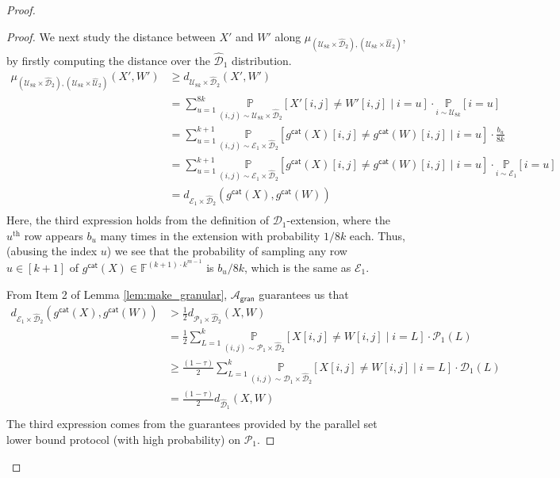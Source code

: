 \documentclass[10pt,a4paper]{article}
\newcommand{\gran}{\mathsf{gran}}
\newcommand{\F}{\mathbb{F}}
\newcommand{\sU}{\mathcal{U}}
\newcommand{\sD}{\mathcal{D}}
\newcommand{\sA}{\mathcal{A}}
\newcommand{\sP}{\mathcal{P}}
\begin{document}
\begin{proof}
\begin{proof}
    We next study the distance between $X'$ and $W'$ along $\mu_{(\sU_{8k} \times \widehat{\sD}_{2}), (\sU_{8k} \times \widehat{\sU}_{2})}$, by firstly computing the distance over the $\widehat{\sD}_{1}$ distribution. 
    \begin{equation*}
        \begin{split}
            \mu_{(\sU_{8k} \times \widehat{\sD}_{2}), (\sU_{8k} \times \widehat{\sU}_{2})} (X', W') &\geq d_{\sU_{8k} \times \widehat{\sD}_{2}} (X', W') \\
            &= \sum_{u=1}^{8k} \underset{(i,j) \sim \sU_{8k} \times \widehat{\sD}_{2}}{\mathbb{P}} \left[ X'[i,j] \neq W'[i,j] \mid i = u \right] \cdot \underset{i \sim \sU_{8k}}{\mathbb{P}} [i=u]\\
             &= \sum_{u=1}^{k+1} \underset{(i,j) \sim \mathcal{E}_{1} \times \widehat{\sD}_{2}}{\mathbb{P}} \left[ g^{\mathsf{cat}}(X)[i,j] \neq g^{\mathsf{cat}}(W)[i,j] \mid i=u \right] \cdot \frac{b_u}{8k} \\
            &= \sum_{u=1}^{k+1} \underset{(i,j) \sim \mathcal{E}_{1} \times \widehat{\sD}_{2}}{\mathbb{P}} \left[ g^{\mathsf{cat}}(X)[i,j] \neq g^{\mathsf{cat}}(W)[i,j] \mid i=u \right] \cdot \underset{i \sim \mathcal{E}_{1}}{\mathbb{P}} [i=u]\\
            &= d_{\mathcal{E}_{1} \times \widehat{\sD}_{2}} (g^{\mathsf{cat}}(X),g^{\mathsf{cat}}(W))\\
        \end{split}
    \end{equation*}
    Here, the third expression holds from the definition of $\sD_{1}$-extension, where the $u^{\text{th}}$ row appears $b_u$ many times in the extension with probability $1/8k$ each. Thus, (abusing the index $u$) we see that the probability of sampling any row $u \in [k+1]$ of $g^{\mathsf{cat}}(X) \in \F^{(k+1)\cdot k^{m-1}}$ is $b_u/8k$, which is the same as $\mathcal{E}_{1}$.

    From Item 2 of Lemma \ref{lem:make_granular}, $\sA_\gran$ guarantees us that
    \begin{equation*}
        \begin{split}
            d_{\mathcal{E}_{1} \times \widehat{\sD}_{2}} (g^{\mathsf{cat}}(X),g^{\mathsf{cat}}(W)) 
            &> \frac{1}{2} d_{\sP_{1} \times \widehat{\sD}_{2}} (X, W) \\
            &= \frac{1}{2}\sum_{L=1}^k \underset{(i,j) \sim \sP_{1} \times \widehat{\sD}_{2}}{\mathbb{P}} [X[i,j] \neq W[i,j] \mid i = L] \cdot \sP_{1}(L)  \\
            &\geq \frac{(1-\tau)}{2}\sum_{L=1}^k \underset{(i,j) \sim \sD_{1} \times \widehat{\sD}_{2}}{\mathbb{P}} [X[i,j] \neq W[i,j] \mid i = L] \cdot \sD_{1}(L)  \\
            &= \frac{(1-\tau)}{2}d_{\widehat{\sD}_{1}}(X, W) \\
        \end{split}
    \end{equation*}
    The third expression comes from the guarantees provided by the parallel set lower bound protocol (with high probability) on $\sP_{1}$.


\end{proof}
\end{proof}
\end{document}

